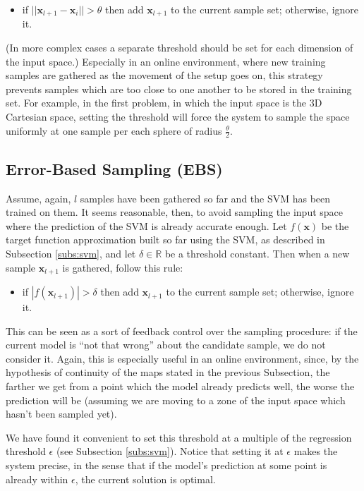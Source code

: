 \documentclass[conference]{IEEEtran}
\def\RR{\mathbb{R}}
\def\xx{\mathbf{x}}
\begin{document}
\begin{itemize}
  \item if $||\xx_{l+1}-\xx_i|| > \theta$ then add $\xx_{l+1}$ to
    the current sample set; otherwise, ignore it.
\end{itemize}

\noindent (In more complex cases a separate threshold should be set
for each dimension of the input space.) Especially in an online
environment, where new training samples are gathered as the movement
of the setup goes on, this strategy prevents samples which are too
close to one another to be stored in the training set. For example, in
the first problem, in which the input space is the 3D Cartesian space,
setting the threshold will force the system to sample the space
uniformly at one sample per each sphere of radius $\frac{\theta}{2}$.

\subsection{Error-Based Sampling (EBS)}

Assume, again, $l$ samples have been gathered so far and the SVM has
been trained on them. It seems reasonable, then, to avoid sampling the
input space where the prediction of the SVM is already accurate
enough. Let $f(\xx)$ be the target function approximation built so far
using the SVM, as described in Subsection \ref{subs:svm}, and let
$\delta \in \RR$ be a threshold constant. Then when a new sample
$\xx_{l+1}$ is gathered, follow this rule:

\begin{itemize}
  \item if $|f(\xx_{l+1})| > \delta$ then add $\xx_{l+1}$ to the
    current sample set; otherwise, ignore it.
\end{itemize}

This can be seen as a sort of feedback control over the sampling
procedure: if the current model is ``not that wrong'' about the
candidate sample, we do not consider it. Again, this is especially
useful in an online environment, since, by the hypothesis of
continuity of the maps stated in the previous Subsection, the farther
we get from a point which the model already predicts well, the worse
the prediction will be (assuming we are moving to a zone of the input
space which hasn't been sampled yet).

We have found it convenient to set this threshold at a multiple of the
regression threshold $\epsilon$ (see Subsection
\ref{subs:svm}). Notice that setting it at $\epsilon$ makes the system
precise, in the sense that if the model's prediction at some point is
already within $\epsilon$, the current solution is optimal.
\end{document}
